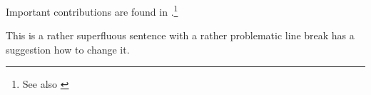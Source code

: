
Important contributions are found in \citet{Meier2022}.\footnote{See also \citet{Meier2033}}

This is a rather superfluous sentence with a rather problematic line break  has a suggestion how to change it.
